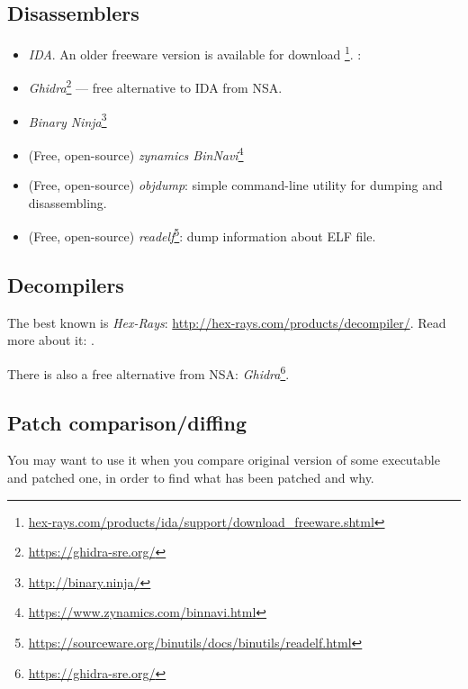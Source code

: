 \subsection{Disassemblers}


\begin{itemize}
\item \emph{IDA}. An older freeware version is available for download
\footnote{\href{http://go.yurichev.com/17031}{hex-rays.com/products/ida/support/download\_freeware.shtml}}.
\ShortHotKeyCheatsheet: 

\item \emph{Ghidra}\footnote{\url{https://ghidra-sre.org/}} --- free alternative to IDA from \ac{NSA}.

\item \emph{Binary Ninja}\footnote{\url{http://binary.ninja/}}

\item (Free, open-source) \emph{zynamics BinNavi}\footnote{\url{https://www.zynamics.com/binnavi.html}}

\item (Free, open-source) \emph{objdump}: simple command-line utility for dumping and disassembling.

\item (Free, open-source) \emph{readelf}\footnote{\url{https://sourceware.org/binutils/docs/binutils/readelf.html}}:
dump information about ELF file.
\end{itemize}

\subsection{Decompilers}

The best known is \emph{Hex-Rays}: \url{http://hex-rays.com/products/decompiler/}.
Read more about it: .

There is also a free alternative from \ac{NSA}: \emph{Ghidra}\footnote{\url{https://ghidra-sre.org/}}.

\subsection{Patch comparison/diffing}

You may want to use it when you compare original version of some executable and patched one, in order to find
what has been patched and why.

